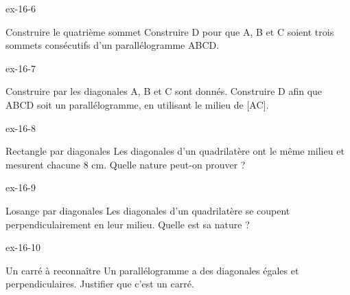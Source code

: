 \begin{blocLivre}{ex-16-6}\begin{exercice}[2]{Construire le quatrième sommet}
Construire D pour que A, B et C soient trois sommets consécutifs d’un parallélogramme ABCD.
\label{fig-ex-16-6}
\end{exercice}\end{blocLivre}
\begin{blocLivre}{ex-16-7}\begin{exercice}[2]{Construire par les diagonales}
A, B et C sont donnés. Construire D afin que ABCD soit un parallélogramme, en utilisant le milieu de [AC].
\label{fig-ex-16-7}
\end{exercice}\end{blocLivre}
\begin{blocLivre}{ex-16-8}\begin{exercice}[2]{Rectangle par diagonales}
Les diagonales d’un quadrilatère ont le même milieu et mesurent chacune 8 cm. Quelle nature peut-on prouver ?
\label{fig-ex-16-8}
\end{exercice}\end{blocLivre}
\begin{blocLivre}{ex-16-9}\begin{exercice}[2]{Losange par diagonales}
Les diagonales d’un quadrilatère se coupent perpendiculairement en leur milieu. Quelle est sa nature ?
\label{fig-ex-16-9}
\end{exercice}\end{blocLivre}
\begin{blocLivre}{ex-16-10}\begin{exercice}[2]{Un carré à reconnaître}
Un parallélogramme a des diagonales égales et perpendiculaires. Justifier que c’est un carré.
\label{fig-ex-16-10}
\end{exercice}\end{blocLivre}

